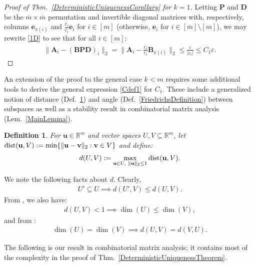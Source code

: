 \documentclass[journal, twocolumn]{IEEEtran}
\newtheorem{definition}{Definition}
\begin{document}
\begin{proof}[Proof of Thm.~\ref{DeterministicUniquenessCorollary} for $k=1$]
Letting $\mathbf{P}$ and $\mathbf{D}$ be the $\overline m \times \overline m$ permutation and invertible diagonal matrices with, respectively, columns $\mathbf{e}_{\pi(i)}$ and $\frac{\overline{c}_i}{c_i}\mathbf{e}_i$ for $i \in [m]$ (otherwise, $\mathbf{e}_{i}$ for $i \in [\overline{m}] \setminus [m]$), we may rewrite \eqref{1D} to see that for all $i \in [m]$:
\begin{align*}
\|\mathbf{A}_i - (\mathbf{BPD})_i\|_2 
= \|\mathbf{A}_i - \frac{\overline{c}_i}{c_i}\mathbf{B}_{\pi(i)}\|_2 
\leq \frac{\varepsilon}{|c_i|} 
\leq C_1\varepsilon.
\end{align*}
\end{proof}

An extension of the proof to the general case $k < m$ requires some additional tools to derive the general expression \eqref{Cdef1} for $C_1$. These include a generalized notion of distance (Def.~\ref{dDef}) and angle (Def.~\ref{FriedrichsDefinition}) between subspaces as well as a stability result in combinatorial matrix analysis (Lem.~\ref{MainLemma}). 

\begin{definition}\label{dDef}
For $\mathbf{u} \in \mathbb R^m$ and vector spaces $U,V \subseteq \mathbb{R}^m$, let $\text{\rm dist}(\mathbf{u}, V) := \min \{\| \mathbf{u}-\mathbf{v} \|_2: \mathbf{v} \in V\}$ and define:
\begin{align}
d(U,V) := \max_{\mathbf{u} \in U, \ \|\mathbf{u}\|_2 \leq 1} \text{\rm dist}(\mathbf{u},V).
\end{align}
\end{definition}

We note the following facts about $d$. Clearly, 
\begin{align}\label{UsubU}
U' \subseteq U \implies d(U',V) \leq d(U,V).
\end{align}
From \cite[Ch.~4 Cor.~2.6]{Kato2013}, we also have: %
\begin{align}\label{dimLem}
d(U,V) < 1 \implies \dim(U) \leq \dim(V),
\end{align}
and from \cite[Lem.~3.2]{Morris10}:
\begin{align}\label{eqdim}
\dim(U) = \dim(V) \implies d(U,V) = d(V,U).
\end{align}

The following is our result in combinatorial matrix analysis; it contains most of the complexity in the proof of Thm.~\ref{DeterministicUniquenessTheorem}. 
\end{document}
